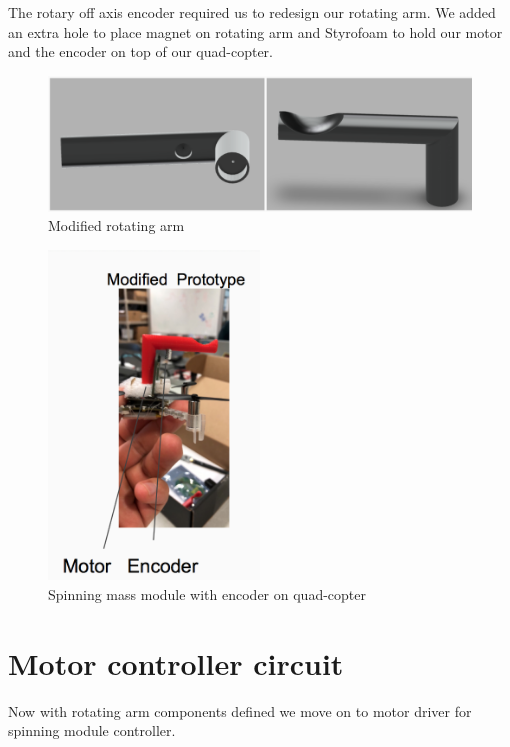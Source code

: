 The rotary off axis encoder required us to redesign our rotating arm. We added an extra hole to place magnet on rotating arm and Styrofoam to hold our motor and the encoder on top of our quad-copter. 
\begin{center}
\begin{figure}[H]
\centering
\includegraphics[width=1.0\textwidth]{./Amir_img/modifiedArm.png}
\caption{Modified rotating arm}
\end{figure}


\begin{figure}[H]
\centering
\includegraphics[width=0.5\textwidth]{./Amir_img/updatedController.png}
\caption{Spinning mass module with encoder on quad-copter}
\end{figure}
\end{center}





\section{Motor controller circuit}
Now with rotating arm components defined we move on to motor driver for spinning module controller. 
